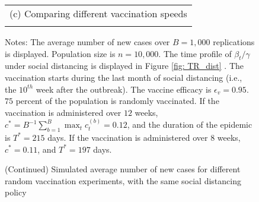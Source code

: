 \documentclass[12pt]{article}
\begin{document}
\addtocounter{figure}{-1}%
%

\begin{figure}[tp]%
\caption
{(Continued) Simulated average number of new cases for different random vaccination experiments, with the same social distancing policy}%
\begin{footnotesize}%


\begin{center}
%

\begin{tabular}
[c]{c}%
(c) Comparing different vaccination speeds%
\vspace{0.2cm}%
\\%
{\includegraphics[
height=1.9951in,
width=2.6524in
]%
{figs/theory_cmp_vacc_weeks_dist_pct75_eff95_Wbeg10_dcT.png}%
}
\end{tabular}

\end{center}

%

\vspace{-0.2cm}%
Notes: The average number of new cases over $B=1,000$ replications is
displayed. Population size is $n=10,000$. The time profile of $\beta
_{t}/\gamma$ under social distancing is displayed in Figure \ref{fig: TR_dist}%
. The vaccination starts during the last month of social distancing (i.e., the
$10^{th}$ week after the outbreak). The vaccine efficacy is $\epsilon
_{v}=0.95$. $75$ percent of the population is randomly vaccinated. If the
vaccination is administered over $12$ weeks, $c^{\ast}=B^{-1}\sum_{b=1}%
^{B}\max_{t}c_{t}^{(b)}=0.12$, and the duration of the epidemic is $T^{\ast
}=215$ days. If the vaccination is administered over $8$ weeks, $c^{\ast
}=0.11$, and $T^{\ast}=197$ days.%


\end{footnotesize}
\end{figure}
\end{document}
